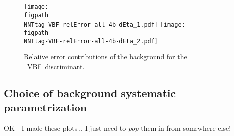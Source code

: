 \begin{figure}[ht]
	\centering
		\texttt{[image: \\figpath\\NNTtag-VBF-relError-all-4b-dEta\_1.pdf]}
		\texttt{[image: \\figpath\\NNTtag-VBF-relError-all-4b-dEta\_2.pdf]}
	\caption{Relative error contributions of the background for the \bcat~VBF~discriminant.}
	\label{fig:bkgRelErr-VBF-4b}
\end{figure}

\subsection{Choice of background systematic parametrization}
\label{subsec:bkgUnc-stats}

OK - I made these plots... I just need to \emph{pop} them in from somewhere else!

%


